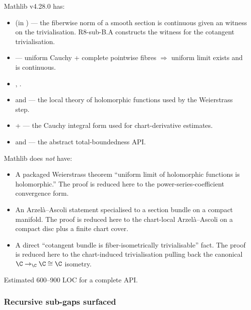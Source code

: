 Mathlib v4.28.0 has:
\begin{itemize}
\item {} (in
  ) --- the
  fiberwise norm of a smooth section is continuous given an
   witness on the trivialisation.  R8-sub-B.A
  constructs the  witness for the cotangent
  trivialisation.
\item {}
  --- uniform Cauchy + complete pointwise fibres \(\Rightarrow\) uniform limit
  exists and is continuous.
\item {},
  .
\item {} and
   --- the local theory of
  holomorphic functions used by the Weierstrass step.
\item {} +
   --- the Cauchy
  integral form used for chart-derivative estimates.
\item {} and
   --- the abstract
  total-boundedness API.
\end{itemize}

Mathlib does \emph{not} have:
\begin{itemize}
\item A packaged Weierstrass theorem ``uniform limit of holomorphic
  functions is holomorphic.''  The proof is reduced here to the
  power-series-coefficient convergence form.
\item An Arzel\`a--Ascoli statement specialised to a section bundle
  on a compact manifold.  The proof is reduced here to the chart-local
  Arzel\`a--Ascoli on a compact disc plus a finite chart cover.
\item A direct ``cotangent bundle is fiber-isometrically trivialisable''
  fact.  The proof is reduced here to the chart-induced trivialisation
  pulling back the canonical \(\C\to_{\C}\C\cong\C\) isometry.
\end{itemize}

Estimated 600--900 LOC for a complete API.

\subsubsection*{Recursive sub-gaps surfaced}

